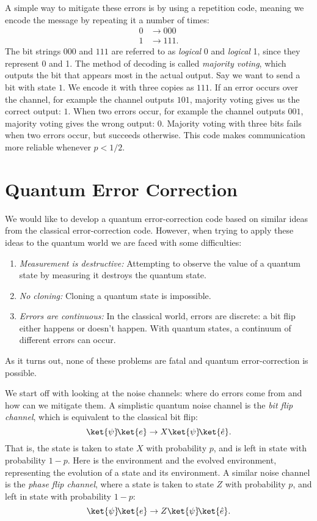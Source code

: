 A simple way to mitigate these errors is by using a repetition code, meaning we encode the message by repeating it a number of times:
\begin{align}
  0 &\rightarrow 000 \\
  1 &\rightarrow 111.
\end{align}
The bit strings $000$ and $111$ are referred to as \emph{logical} 0 and \emph{logical} 1, since they represent 0 and 1. The method of decoding is called \emph{majority voting}, which outputs the bit that appears most in the actual output. Say we want to send a bit with state $1$. We encode it with three copies as $111$. If an error occurs over the channel, for example the channel outputs $101$, majority voting gives us the correct output: $1$. When two errors occur, for example the channel outputs $001$, majority voting gives the wrong output: $0$. Majority voting with three bits fails when two errors occur, but succeeds otherwise. This code makes communication more reliable whenever $p < 1/2$.

\section{Quantum Error Correction}
We would like to develop a quantum error-correction code based on similar ideas from the classical error-correction code. However, when trying to apply these ideas to the quantum world we are faced with some difficulties:
\begin{enumerate}
  \item \emph{Measurement is destructive:} Attempting to observe the value of a quantum state by measuring it destroys the quantum state.
  \item \emph{No cloning:} Cloning a quantum state is impossible.
  \item \emph{Errors are continuous:} In the classical world, errors are discrete: a bit flip either happens or doesn't happen. With quantum states, a continuum of different errors can occur.
\end{enumerate}
As it turns out, none of these problems are fatal and quantum error-correction is possible.

We start off with looking at the noise channels: where do errors come from and how can we mitigate them. A simplistic quantum noise channel is the \emph{bit flip channel}, which is equivalent to the classical bit flip:
\begin{equation}
  \ket{\psi}\!\ket{e} \rightarrow X\ket{\psi}\!\ket{\hat{e}}.
\end{equation}
That is, the state \ket{\psi} is taken to state $X$\ket{\psi} with probability $p$, and is left in state \ket{\psi} with probability $1 - p$. Here  is the environment and  the evolved environment, representing the evolution of a state and its environment. A similar noise channel is the \emph{phase flip channel}, where a state \ket{\psi} is taken to state $Z$\ket{\psi} with probability $p$, and left in state \ket{\psi} with probability $1 - p$:
\begin{equation}
  \ket{\psi}\!\ket{e} \rightarrow Z\ket{\psi}\!\ket{\hat{e}}.
\end{equation}

